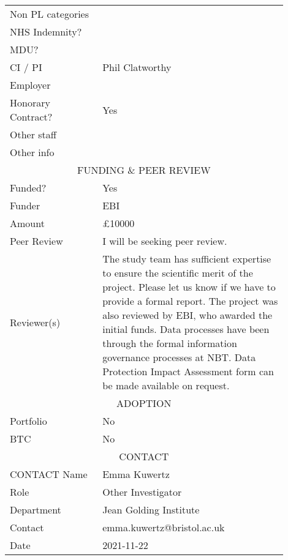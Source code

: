 \documentclass{article}
\begin{document}
\begin{small}
\begin{center}
\begin{tabular}{p{0.3\linewidth}p{0.6\linewidth}}
      \hline
      Non PL categories & \\
      NHS Indemnity? & \\
      MDU? & \\
      CI / PI &  Phil Clatworthy\\
      Employer & \\
      Honorary Contract? & Yes\\
      Other staff & \\
      Other info & \\
      \hline\hline
      \multicolumn{2}{c}{FUNDING \& PEER REVIEW}\\
      \hline
      Funded? &  Yes\\
      Funder &  EBI\\
      Amount &  £10000\\
      Peer Review &  I will be seeking peer review.\\
      Reviewer(s) &  The study team has sufficient expertise to ensure
                    the scientific merit of the project. Please let us
                    know if we have to provide a formal report. The project was also reviewed by EBI, who awarded the initial funds. Data processes have been through the formal information governance processes at NBT. Data Protection Impact Assessment form can be made available on request.\\
      \hline\hline
      \multicolumn{2}{c}{ADOPTION}\\
      \hline
      Portfolio &  No\\
      BTC &  No\\
      \hline\hline
      \multicolumn{2}{c}{CONTACT}\\
      \hline
      CONTACT
      Name &  Emma Kuwertz\\
      Role &  Other Investigator\\
      Department &  Jean Golding Institute\\
      Contact &  emma.kuwertz@bristol.ac.uk\\
      Date &  2021-11-22\\
      \hline
    \end{tabular}
  \end{center}
\end{small}

\printbibliography
\end{document}
